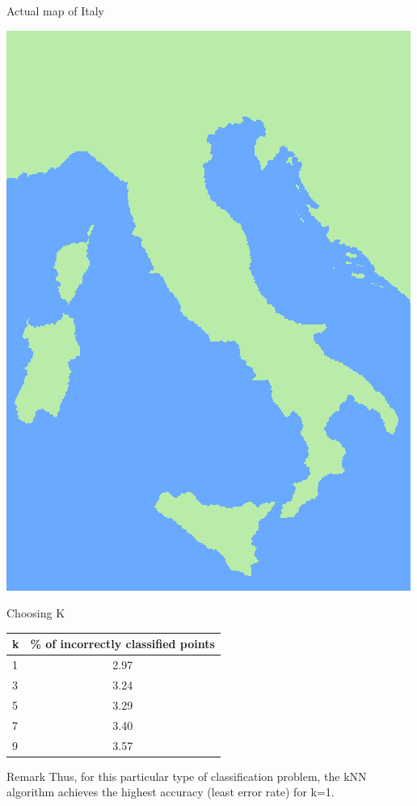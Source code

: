 \documentclass{beamer}
\begin{document}
\begin{frame}{Actual map of Italy}

    \includegraphics[scale=0.5]{images/italy_final.png}
    \centering

\end{frame}


\begin{frame}{Choosing K}\vspace{10pt}

    \begin{table}[]
\begin{tabular}{@{}l{}c}
\toprule
k &  \% of incorrectly classified points \\ \midrule
1 & 2.97                                \\
3 & 3.24                                \\
5 & 3.29                                \\
7 & 3.40                                \\
9 & 3.57                                \\ \bottomrule
\end{tabular}
\end{table}
\begin{block}{Remark}
Thus, for this particular type of classification problem, the kNN algorithm achieves the
highest accuracy (least error rate) for k=1.
\end{block}

\end{frame}
\end{document}
